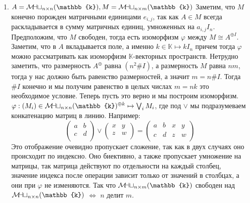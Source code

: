 \documentclass{article}
\newcommand{\mymat}{\mathcal{M\mkern-3mu a\mkern-0.3mu t}}
\begin{document}
\begin{enumerate}
\begin{enumerate}
            \item $A=\mymat_{n\times n}(\mathbb{k}), M=\mymat_{n\times m}(\mathbb{k})$
                Заметим, что $M$ конечно порожден матричными единицами $e_{i,j}$, так как $A\in M$
                всегда раскладывается в сумму матричных единиц, умноженных на $a_{i,j}I_n$. Предположим,
                что $M$ свободен, тогда есть изоморфизм $\varphi$ между $M\cong A^{\oplus I}$. Заметим,
                что в $A$ вкладывается поле, а именно $k\in\mathbb{K}\mapsto kI_n$ причем тогда $\varphi$
                можно рассматривать как изоморфизм $\mathbb{K}$-векторных пространств. Нетрудно заметить, 
                что размерность $A^{\oplus}$ равна $(n^2\#I)$, а размерность $M$ равна $nm$, тогда у нас
                должно быть равенство размерностей, а значит $m=n\#I$. Тогда $\#I$ конечно и мы получим
                равенство в целых числах $m=nk$ это необходимое условие. Теперь пусть это верно и мы построим
                изоморфизм. $\varphi:(M_i)\in\mymat_{n\times n}(\mathbb{k})^{\oplus k}\mapsto \bigvee_i M_i$,
                где под $\vee$ мы подразумеваем конкатенацию матриц в линию. Например:
                \[
                    \left(\begin{array}{cc}
                        a & b\\
                        c & d\\
                    \end{array}\right)\vee
                    \left(\begin{array}{cc}
                        x & y\\
                        z & w\\
                    \end{array}\right)=
                    \left(\begin{array}{cccc}
                        a & b & x & y\\
                        c & d & z & w\\
                    \end{array}\right)
                \]
                Это отображение очевидно пропускает сложение, так как в двух случаях оно происходит по индексно.
                Оно биективно, а также пропускает умножение на матрицы, так матрица действуют по отдельности на
                каждый столбец, значение индекса после операции зависит только от значений в столбцах, а они
                при $\varphi$ не изменяются. Так что $\mymat_{n\times m}(\mathbb{k})$ свободен над
                $\mymat_{n\times n}(\mathbb{k})$ $\Leftrightarrow$ $n$ делит $m$.
        \end{enumerate}


\end{enumerate}
\end{document}

